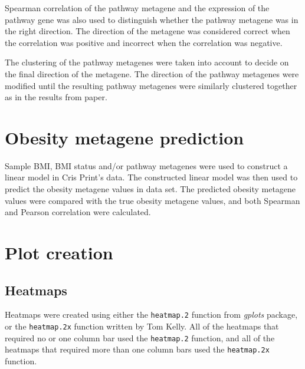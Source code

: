 Spearman correlation of the pathway metagene and the expression of the pathway gene was also used to distinguish whether the pathway metagene was in the right direction.
The direction of the metagene was considered correct when the correlation was positive and incorrect when the correlation was negative.

The clustering of the pathway metagenes were taken into account to decide on the final direction of the metagene.
The direction of the pathway metagenes were modified until the resulting pathway metagenes were similarly clustered together as in the results from \citet{Gatza2010a} paper.

\section{Obesity metagene prediction}
\label{sec:obesity_metagene_prediction}

Sample BMI, BMI status and/or pathway metagenes were used to construct a linear model in Cris Print's data.
The constructed linear model was then used to predict the obesity metagene values in \citet{Creighton2012} data set.
The predicted obesity metagene values were compared with the true obesity metagene values, and both Spearman and Pearson correlation were calculated.

\section{Plot creation}
\label{sec:plot_creation}

\subsection{Heatmaps}
\label{sub:heatmaps}

Heatmaps were created using either the \texttt{heatmap.2} function from \textit{gplots} package, or the \texttt{heatmap.2x} function written by Tom Kelly.
All of the heatmaps that required no or one column bar used the \texttt{heatmap.2} function, and all of the heatmaps that required more than one column bars used the \texttt{heatmap.2x} function.




